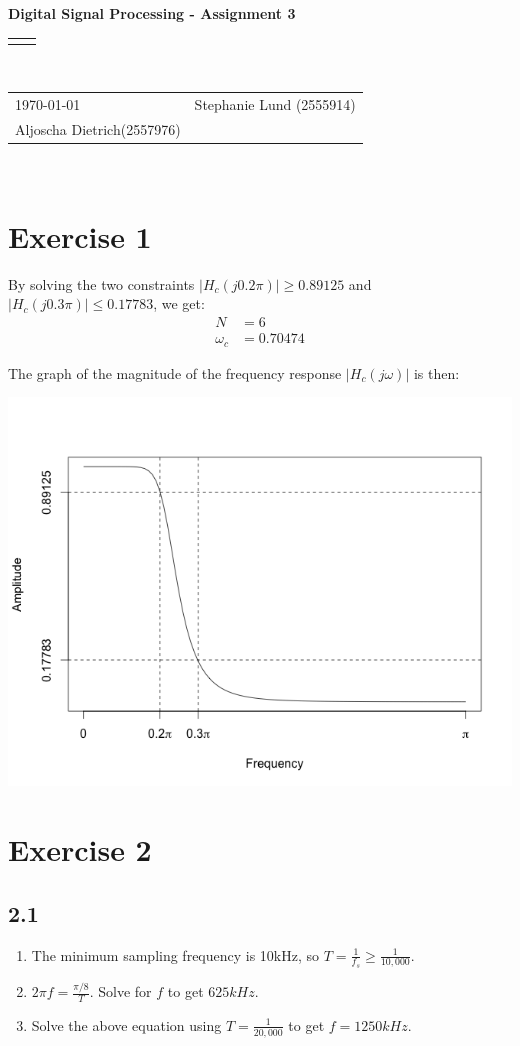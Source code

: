 \documentclass[12pt]{article}
\renewcommand{\title}[1]{\textbf{#1}\\}
\renewcommand{\line}{\begin{tabularx}{\textwidth}{X>{\raggedleft}X}\hline\\\end{tabularx}\\[-0.5cm]}
\newcommand{\leftright}[2]{\begin{tabularx}{\textwidth}{X>{\raggedleft}X}#1%
& #2\\\end{tabularx}\\[-0.5cm]}
\begin{document}
\title{Digital Signal Processing - Assignment 3}
\line
\leftright{\today}{Stephanie Lund (2555914)\\Aljoscha Dietrich(2557976)} %

\section*{Exercise 1}
By solving the two constraints $\lvert H_c(j 0.2\pi) \rvert \geq 0.89125$ and $\lvert H_c(j 0.3\pi) \rvert \leq 0.17783$, we get:
\begin{align*}
	N &= 6\\
	\omega_c &= 0.70474
\end{align*}

The graph of the magnitude of the frequency response $\lvert H_c(j\omega) \rvert$ is then:

\includegraphics[scale=0.65]{hw3-1.png}

\section*{Exercise 2}

\subsection*{2.1}
\begin{enumerate}[label=\alph*)]
\item The minimum sampling frequency is 10kHz, so $T = \frac{1}{f_s} \geq \frac{1}{10,000}$.

\item $2\pi f = \frac{\pi/8}{T}$. Solve for $f$ to get $625 kHz$.

\item Solve the above equation using $T = \frac{1}{20,000}$ to get $f = 1250 kHz$.


\end{enumerate}
\end{document}
